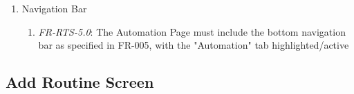 \documentclass[conference]{IEEEtran}
\begin{document}
\begin{enumerate}
\begin{enumerate}
\begin{enumerate}
                                        \item \textit{FR-ITS-4.3}: The "New Routine" button must display the text "New Routine" and an "Add" icon (+).
                                        \item \textit{FR-ITS-4.4}: Tapping the "New Routine" button (FR-RTS-4.2) must navigate the user to the "Create Routine" screen (same action as FR-RTS-4.0).
                                    \end{enumerate}
                                \item Navigation Bar
                                    \begin{enumerate}
                                        \item \textit{FR-RTS-5.0}: The Automation Page must include the bottom navigation bar as specified in FR-005, with the "Automation" tab highlighted/active
                                    \end{enumerate}
                            \end{enumerate}
                        \end{enumerate}

        \subsection{\textbf{Add Routine Screen}}
\end{document}
